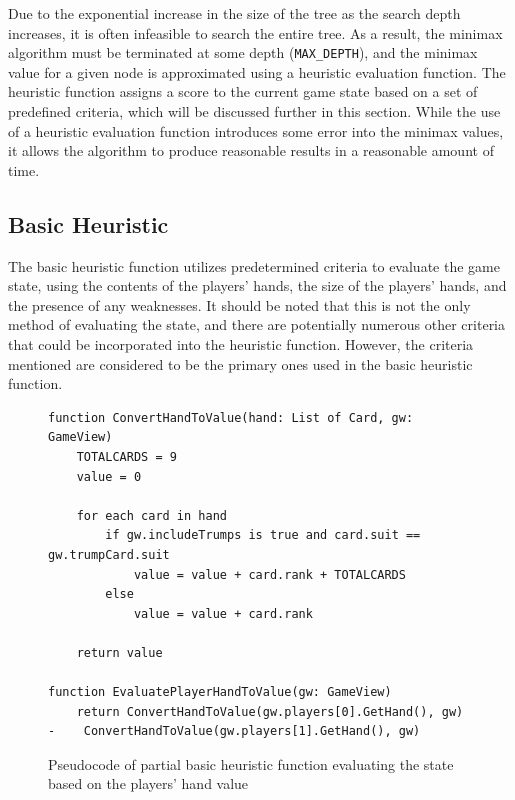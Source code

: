 Due to the exponential increase in the size of the tree as the search depth increases, it is often infeasible to search the entire tree. As a result, the minimax algorithm must be terminated at some depth (\texttt{MAX\_DEPTH}), and the minimax value for a given node is approximated using a heuristic evaluation function. The heuristic function assigns a score to the current game state based on a set of predefined criteria, which will be discussed further in this section. While the use of a heuristic evaluation function introduces some error into the minimax values, it allows the algorithm to produce reasonable results in a reasonable amount of time.

\subsection{Basic Heuristic}
The basic heuristic function utilizes predetermined criteria to evaluate the game state, using the contents of the players' hands, the size of the players' hands, and the presence of any weaknesses. It should be noted that this is not the only method of evaluating the state, and there are potentially numerous other criteria that could be incorporated into the heuristic function. However, the criteria mentioned are considered to be the primary ones used in the basic heuristic function.

\begin{figure}[h]
\captionsetup{justification=centering}
\begin{lstlisting}
function ConvertHandToValue(hand: List of Card, gw: GameView)
    TOTALCARDS = 9
    value = 0

    for each card in hand
        if gw.includeTrumps is true and card.suit == gw.trumpCard.suit
            value = value + card.rank + TOTALCARDS
        else
            value = value + card.rank

    return value

function EvaluatePlayerHandToValue(gw: GameView)
    return ConvertHandToValue(gw.players[0].GetHand(), gw) - 	ConvertHandToValue(gw.players[1].GetHand(), gw)
\end{lstlisting}
\caption{Pseudocode of partial basic heuristic function evaluating the state based on the players' hand value}
\label{fig:BHPlayersHandValue}
\end{figure}

